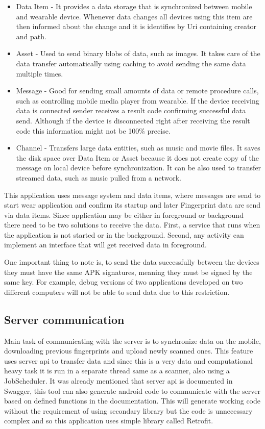 \begin{itemize}
	\item Data Item - It provides a data storage that is synchronized between mobile and wearable device. Whenever data changes all devices using this item are then informed about the change and it is identifies by Uri containing creator and path.
	\item Asset - Used to send binary blobs of data, such as images. It takes care of the data transfer automatically using caching to avoid sending the same data multiple times.
	\item Message - Good for sending small amounts of data or remote procedure calls, such as controlling mobile media player from wearable. If the device receiving data is connected sender receives a result code confirming successful data send. Although if the device is disconnected right after receiving the result code this information might not be 100\% precise.
	\item Channel - Transfers large data entities, such as music and movie files. It saves the disk space over Data Item or Asset because it does not create copy of the message on local device before synchronization. It can be also used to transfer streamed data, such as music pulled from a network.
\end{itemize}

This application uses message system and data items, where messages are send to start wear application and confirm its startup and later Fingerprint data are send via data items. Since application may be either in foreground or background there need to be two solutions to receive the data. First, a service that runs when the application is not started or in the background. Second, any activity can implement an interface that will get received data in foreground.

One important thing to note is, to send the data successfully between the devices they must have the same APK signatures, meaning they must be signed by the same key. For example, debug versions of two applications developed on two different computers will not be able to send data due to this restriction.

\subsection{Server communication}\label{subsec:ServerCommunication}
Main task of communicating with the server is to synchronize data on the mobile, downloading previous fingerprints and upload newly scanned ones. This feature uses server api to transfer data and since this is a very data and computational heavy task it is run in a separate thread same as a scanner, also using a JobScheduler. It was already mentioned that server api is documented in Swagger, this tool can also generate android code to communicate with the server based on defined functions in the documentation. This will generate working code without the requirement of using secondary library but the code is unnecessary complex and so this application uses simple library called Retrofit.

